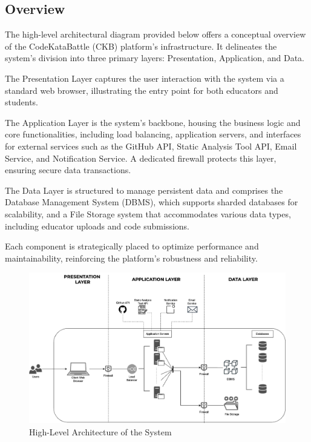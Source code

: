 \subsection{Overview}

The high-level architectural diagram provided below offers a conceptual overview of the CodeKataBattle (CKB) platform's infrastructure. It delineates the system's division into three primary layers: Presentation, Application, and Data. 

The Presentation Layer captures the user interaction with the system via a standard web browser, illustrating the entry point for both educators and students. 

The Application Layer is the system's backbone, housing the business logic and core functionalities, including load balancing, application servers, and interfaces for external services such as the GitHub API, Static Analysis Tool API, Email Service, and Notification Service. A dedicated firewall protects this layer, ensuring secure data transactions. 

The Data Layer is structured to manage persistent data and comprises the Database Management System (DBMS), which supports sharded databases for scalability, and a File Storage system that accommodates various data types, including educator uploads and code submissions. 

Each component is strategically placed to optimize performance and maintainability, reinforcing the platform’s robustness and reliability.

\begin{figure}[H]
    \centering
    \includegraphics[width=\linewidth]{Images/hl-architecture.drawio.png}
    \caption{High-Level Architecture of the System}
\end{figure}



